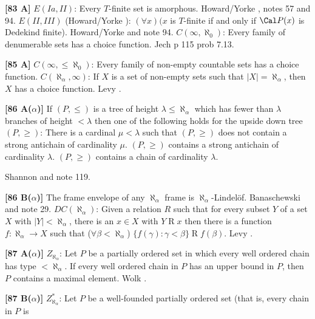 \smallskip
\item{}{\bf [83 A]} $E(Ia,II)$: Every $T$-finite set is amorphous.
\ac{Howard/Yorke} \cite{1989}, notes 57 and 94.
\medskip
{} $E(II,III)$ (\ac{Howard/Yorke} \cite{1989}):
$(\forall x)(x$ is $T$-finite  if and only if $\Cal P(x)$ is Dedekind
finite).  \ac{Howard/Yorke} \cite{1989} and note 94.
\medskip
{}  $C(\infty,\aleph_{0})$:  Every family of
denumerable sets has  a choice function.  \ac{Jech} \cite{1973b} p 115
prob 7.13.
\smallskip
\item{}{\bf [85 A]} $C(\infty,\le\aleph_{0})$: Every family of non-empty
countable sets has  a choice function.
\medskip
{} $C(\aleph_{\alpha},\infty)$:
If $X$ is a set of non-empty sets such that
$|X| = \aleph_{\alpha }$, then $X$ has a choice function.  \ac{Levy}
\cite{1964}.
\smallskip
\item{}{\bf [86 A($\alpha$)]} If $(P,\le)$ is a tree of height $\lambda\le
\aleph_\alpha$ which has fewer than $\lambda$ branches of height
$<\lambda$ then one of the following holds for the upside down tree
$(P,\ge)$:
 There is a cardinal $\mu< \lambda$ such that $(P,\ge)$ does
not contain a strong antichain of cardinality $\mu$.
 $(P,\ge)$ contains a strong antichain of cardinality
$\lambda$.
 $(P,\ge)$ contains a chain of cardinality $\lambda$.\par
\item{}\ac{Shannon} \cite{1992} and note 119.
\smallskip
\item{}{\bf [86 B($\alpha$)]}  The frame envelope of any $\aleph_\alpha$
frame is $\aleph_\alpha$-Lindel\"of.  \ac{Banaschewski} \cite{1998} and
note 29.
\medskip
{}  $DC(\aleph_{\alpha})$: Given a relation
$R$ such that for every subset $Y$ of a set $X$ with $|Y|<\aleph_{\alpha}$,
there is an $x\in X$ with $Y\mathrel R x$ then there is a function
$f:\aleph_{\alpha}\to X$ such that ($\forall\beta < \aleph_{\alpha}$)
$\{f(\gamma): \gamma < \beta\}\mathrel R f(\beta)$. \ac{Levy} \cite{1964}.
\smallskip
\item{}{\bf [87 A($\alpha$)]} $Z_{\aleph_{\alpha }}$: Let $P$ be a
partially ordered set in which every well ordered chain has type
$< \aleph_{\alpha}$. If every well ordered chain in $P$ has an upper
bound in $P$, then $P$ contains a maximal element. \ac{Wolk} \cite{1983}.
\smallskip
\item{}{\bf [87 B($\alpha$)]} $Z^{*}_{\aleph_{\alpha}}$: Let $P$ be a
well-founded partially ordered set (that is, every chain in $P$ is

